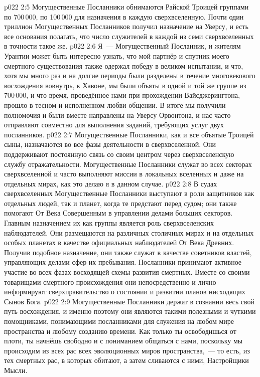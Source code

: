\vs p022 2:5 Могущественные Посланники обнимаются Райской Троицей группами по 700\,000, по 100\,000 для назначения в каждую сверхвселенную. Почти один триллион Могущественных Посланников получил назначение на Уверсу, и есть все основания полагать, что число служителей в каждой из семи сверхвселенных в точности такое же.
\vs p022 2:6 \pc Я~--- Могущественный Посланник, и жителям Урантии может быть интересно узнать, что мой партнёр и спутник моего смертного существования также одержал победу в великом испытании, и что, хотя мы много раз и на долгие периоды были разделены в течение многовекового восхождения вовнутрь, к Хавоне, мы были объяты в одной и той же группе из 700\,000, и что время, проведённое нами при прохождении Вайсджерингтона, прошло в тесном и исполненном любви общении. В итоге мы получили полномочия и были вместе направлены на Уверсу Орвонтона, и нас часто отправляют совместно для выполнения заданий, требующих услуг двух посланников.
\vs p022 2:7 \pc Могущественные Посланники, как и все объятые Троицей сыны, назначаются во все фазы деятельности в сверхвселенной. Они поддерживают постоянную связь со своим центром через сверхвселенскую службу отражательности. Могущественные Посланники служат во всех секторах сверхвселенной и часто выполняют миссии в локальных вселенных и даже на отдельных мирах, как это делаю я в данном случае.
\vs p022 2:8 В судах сверхвселенных Могущественные Посланники выступают в роли защитников как отдельных людей, так и планет, когда те предстают перед судом; они также помогают От Века Совершенным в управлении делами больших секторов. Главным назначением их как группы является роль сверхвселенских наблюдателей. Они размещаются на различных столичных мирах и на отдельных особых планетах в качестве официальных наблюдателей От Века Древних. Получив подобное назначение, они также служат в качестве советников властей, управляющих делами сфер их пребывания. Посланники принимают активное участие во всех фазах восходящей схемы развития смертных. Вместе со своими товарищами смертного происхождения они непосредственно и лично информируют сверхправительство о состоянии и развитии планов нисходящих Сынов Бога.
\vs p022 2:9 Могущественные Посланники держат в сознании весь свой путь восхождения, и именно поэтому они являются такими полезными и чуткими помощниками, понимающими посланниками для служения на любом мире пространства и любому созданию времени. Как только ты освободишься от плоти, ты начнёшь свободно и с пониманием общаться с нами, поскольку мы происходим из всех рас всех эволюционных миров пространства,~--- то есть, из тех смертных рас, в которых обитают, а затем сливаются с ними, Настройщики Мысли.
